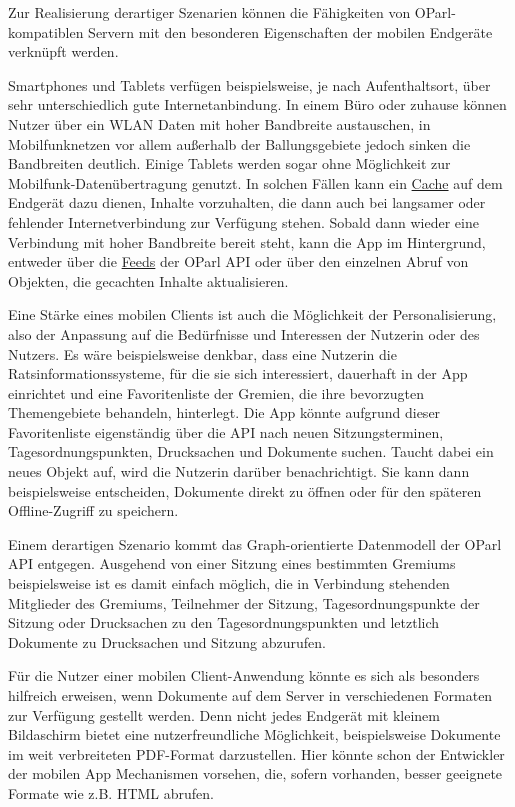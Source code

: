 \documentclass[,a4paper]{article}
\begin{document}
Zur Realisierung derartiger Szenarien können die Fähigkeiten von
OParl-kompatiblen Servern mit den besonderen Eigenschaften der mobilen
Endgeräte verknüpft werden.

Smartphones und Tablets verfügen beispielsweise, je nach Aufenthaltsort,
über sehr unterschiedlich gute Internetanbindung. In einem Büro oder
zuhause können Nutzer über ein WLAN Daten mit hoher Bandbreite
austauschen, in Mobilfunknetzen vor allem außerhalb der Ballungsgebiete
jedoch sinken die Bandbreiten deutlich. Einige Tablets werden sogar ohne
Möglichkeit zur Mobilfunk-Datenübertragung genutzt. In solchen Fällen
kann ein \hyperref[cache]{Cache} auf dem Endgerät dazu dienen, Inhalte
vorzuhalten, die dann auch bei langsamer oder fehlender
Internetverbindung zur Verfügung stehen. Sobald dann wieder eine
Verbindung mit hoher Bandbreite bereit steht, kann die App im
Hintergrund, entweder über die \hyperref[feeds]{Feeds} der OParl API
oder über den einzelnen Abruf von Objekten, die gecachten Inhalte
aktualisieren.

Eine Stärke eines mobilen Clients ist auch die Möglichkeit der
Personalisierung, also der Anpassung auf die Bedürfnisse und Interessen
der Nutzerin oder des Nutzers. Es wäre beispielsweise denkbar, dass eine
Nutzerin die Ratsinformationssysteme, für die sie sich interessiert,
dauerhaft in der App einrichtet und eine Favoritenliste der Gremien, die
ihre bevorzugten Themengebiete behandeln, hinterlegt. Die App könnte
aufgrund dieser Favoritenliste eigenständig über die API nach neuen
Sitzungsterminen, Tagesordnungspunkten, Drucksachen und Dokumente
suchen. Taucht dabei ein neues Objekt auf, wird die Nutzerin darüber
benachrichtigt. Sie kann dann beispielsweise entscheiden, Dokumente
direkt zu öffnen oder für den späteren Offline-Zugriff zu speichern.

Einem derartigen Szenario kommt das Graph-orientierte Datenmodell der
OParl API entgegen. Ausgehend von einer Sitzung eines bestimmten
Gremiums beispielsweise ist es damit einfach möglich, die in Verbindung
stehenden Mitglieder des Gremiums, Teilnehmer der Sitzung,
Tagesordnungspunkte der Sitzung oder Drucksachen zu den
Tagesordnungspunkten und letztlich Dokumente zu Drucksachen und Sitzung
abzurufen.

Für die Nutzer einer mobilen Client-Anwendung könnte es sich als
besonders hilfreich erweisen, wenn Dokumente auf dem Server in
verschiedenen Formaten zur Verfügung gestellt werden. Denn nicht jedes
Endgerät mit kleinem Bildaschirm bietet eine nutzerfreundliche
Möglichkeit, beispielsweise Dokumente im weit verbreiteten PDF-Format
darzustellen. Hier könnte schon der Entwickler der mobilen App
Mechanismen vorsehen, die, sofern vorhanden, besser geeignete Formate
wie z.B. HTML abrufen.
\end{document}
